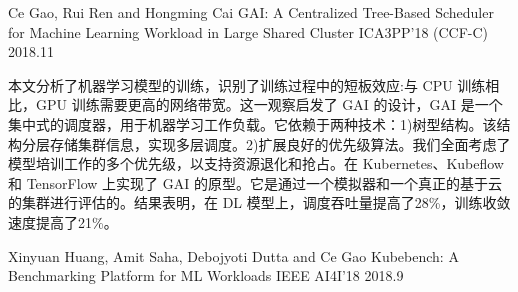 
\begin{cventries}

  \cventry
    {Ce Gao, Rui Ren and Hongming Cai} %
    {GAI: A Centralized Tree-Based Scheduler for Machine Learning Workload in Large Shared Cluster} %
    {ICA3PP'18 (CCF-C)} %
    {2018.11} %
    {
      \begin{cvitems} %
        \item {
          本文分析了机器学习模型的训练，识别了训练过程中的短板效应:与 CPU 训练相比，GPU 训练需要更高的网络带宽。这一观察启发了 GAI 的设计，GAI 是一个集中式的调度器，用于机器学习工作负载。它依赖于两种技术：1)树型结构。该结构分层存储集群信息，实现多层调度。2)扩展良好的优先级算法。我们全面考虑了模型培训工作的多个优先级，以支持资源退化和抢占。在 Kubernetes、Kubeflow 和 TensorFlow 上实现了 GAI 的原型。它是通过一个模拟器和一个真正的基于云的集群进行评估的。结果表明，在 DL 模型上，调度吞吐量提高了28\%，训练收敛速度提高了21\%。
        }
      \end{cvitems}
    }

  \cventry
    {Xinyuan Huang, Amit Saha, Debojyoti Dutta and Ce Gao} %
    {Kubebench: A Benchmarking Platform for ML Workloads} %
    {IEEE AI4I'18} %
    {2018.9} %
    {
    }

\end{cventries}
